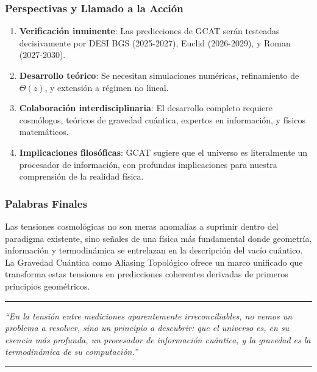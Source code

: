 \documentclass[12pt, a4paper]{article}
\theoremstyle{plain}
\theoremstyle{definition}
\begin{document}
\subsubsection{Perspectivas y Llamado a la Acción}

\begin{enumerate}
    \item \textbf{Verificación inminente}: Las predicciones de GCAT serán testeadas decisivamente por DESI BGS (2025-2027), Euclid (2026-2029), y Roman (2027-2030).
    
    \item \textbf{Desarrollo teórico}: Se necesitan simulaciones numéricas, refinamiento de $\Theta(z)$, y extensión a régimen no lineal.
    
    \item \textbf{Colaboración interdisciplinaria}: El desarrollo completo requiere cosmólogos, teóricos de gravedad cuántica, expertos en información, y físicos matemáticos.
    
    \item \textbf{Implicaciones filosóficas}: GCAT sugiere que el universo es literalmente un procesador de información, con profundas implicaciones para nuestra comprensión de la realidad física.
\end{enumerate}

\subsubsection{Palabras Finales}

Las tensiones cosmológicas no son meras anomalías a suprimir dentro del paradigma existente, sino señales de una física más fundamental donde geometría, información y termodinámica se entrelazan en la descripción del vacío cuántico. La Gravedad Cuántica como Aliasing Topológico ofrece un marco unificado que transforma estas tensiones en predicciones coherentes derivadas de primeros principios geométricos.

\begin{center}
\rule{0.8\textwidth}{0.5pt}

\textit{``En la tensión entre mediciones aparentemente irreconciliables, no vemos un problema a resolver, sino un principio a descubrir: que el universo es, en su esencia más profunda, un procesador de información cuántica, y la gravedad es la termodinámica de su computación.''}

\rule{0.8\textwidth}{0.5pt}
\end{center}
\end{document}
